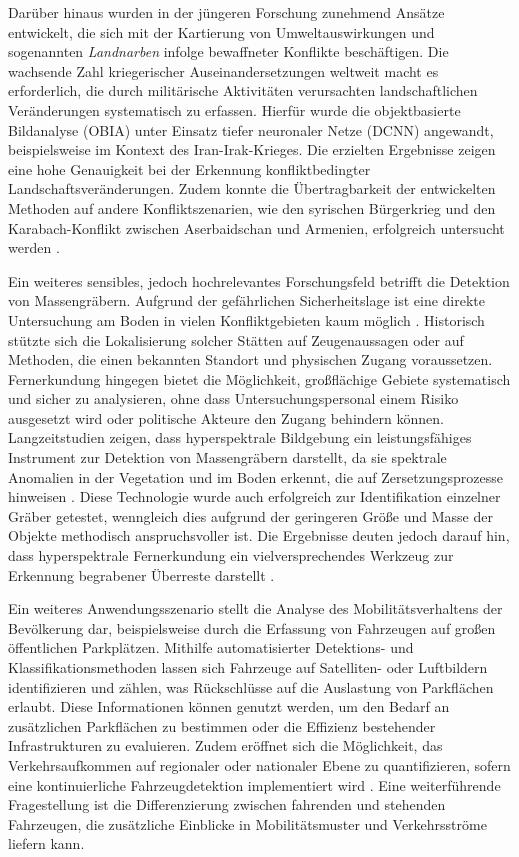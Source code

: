 Darüber hinaus wurden in der jüngeren Forschung zunehmend Ansätze entwickelt, die sich mit der Kartierung von Umweltauswirkungen und sogenannten \emph{Landnarben} infolge bewaffneter Konflikte beschäftigen. Die wachsende Zahl kriegerischer Auseinandersetzungen weltweit macht es erforderlich, die durch militärische Aktivitäten verursachten landschaftlichen Veränderungen systematisch zu erfassen. Hierfür wurde die objektbasierte Bildanalyse (\acrfull{OBIA}) unter Einsatz tiefer neuronaler Netze (\acrfull{DCNN}) angewandt, beispielsweise im Kontext des Iran-Irak-Krieges. Die erzielten Ergebnisse zeigen eine hohe Genauigkeit bei der Erkennung konfliktbedingter Landschaftsveränderungen. Zudem konnte die Übertragbarkeit der entwickelten Methoden auf andere Konfliktszenarien, wie den syrischen Bürgerkrieg und den Karabach-Konflikt zwischen Aserbaidschan und Armenien, erfolgreich untersucht werden \cite{Feizizadeh2025}.

Ein weiteres sensibles, jedoch hochrelevantes Forschungsfeld betrifft die Detektion von Massengräbern. Aufgrund der gefährlichen Sicherheitslage ist eine direkte Untersuchung am Boden in vielen Konfliktgebieten kaum möglich \cite{Kalacska2006}. Historisch stützte sich die Lokalisierung solcher Stätten auf Zeugenaussagen oder auf Methoden, die einen bekannten Standort und physischen Zugang voraussetzen. Fernerkundung hingegen bietet die Möglichkeit, großflächige Gebiete systematisch und sicher zu analysieren, ohne dass Untersuchungspersonal einem Risiko ausgesetzt wird oder politische Akteure den Zugang behindern können. Langzeitstudien zeigen, dass hyperspektrale Bildgebung ein leistungsfähiges Instrument zur Detektion von Massengräbern darstellt, da sie spektrale Anomalien in der Vegetation und im Boden erkennt, die auf Zersetzungsprozesse hinweisen \cite{Kalacska2006}. Diese Technologie wurde auch erfolgreich zur Identifikation einzelner Gräber getestet, wenngleich dies aufgrund der geringeren Größe und Masse der Objekte methodisch anspruchsvoller ist. Die Ergebnisse deuten jedoch darauf hin, dass hyperspektrale Fernerkundung ein vielversprechendes Werkzeug zur Erkennung begrabener Überreste darstellt \cite{Leblanc2014}.

Ein weiteres Anwendungsszenario stellt die Analyse des Mobilitätsverhaltens der Bevölkerung dar, beispielsweise durch die Erfassung von Fahrzeugen auf großen öffentlichen Parkplätzen. Mithilfe automatisierter Detektions- und Klassifikationsmethoden lassen sich Fahrzeuge auf Satelliten- oder Luftbildern identifizieren und zählen, was Rückschlüsse auf die Auslastung von Parkflächen erlaubt. Diese Informationen können genutzt werden, um den Bedarf an zusätzlichen Parkflächen zu bestimmen oder die Effizienz bestehender Infrastrukturen zu evaluieren. Zudem eröffnet sich die Möglichkeit, das Verkehrsaufkommen auf regionaler oder nationaler Ebene zu quantifizieren, sofern eine kontinuierliche Fahrzeugdetektion implementiert wird \cite{Eikvil2009}. Eine weiterführende Fragestellung ist die Differenzierung zwischen fahrenden und stehenden Fahrzeugen, die zusätzliche Einblicke in Mobilitätsmuster und Verkehrsströme liefern kann.

